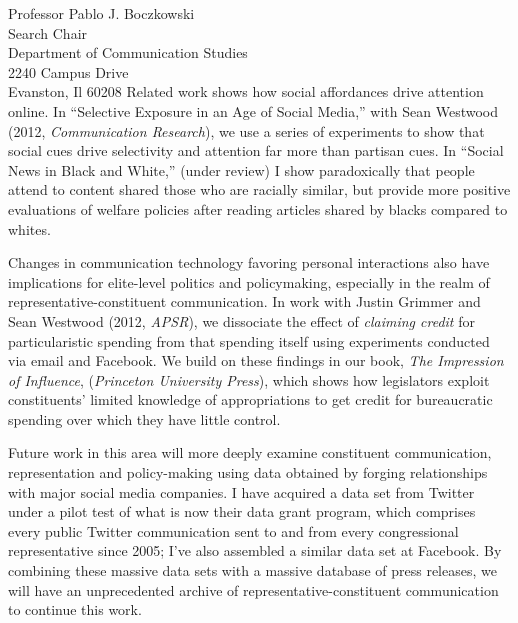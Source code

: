 \documentclass[fontsize=12pt, paper=a4]{scrlttr2}
\begin{document}
\begin{letter}{Professor Pablo J. Boczkowski\\
Search Chair\\
Department of Communication Studies\\
2240 Campus Drive\\
Evanston, Il 60208}
Related work shows how social affordances drive attention online. In ``Selective Exposure in an Age of Social Media,'' with Sean Westwood (2012, \emph{Communication Research}), we use a series of experiments to show that social cues drive selectivity and attention far more than partisan cues.  %
In ``Social News in Black and White,'' (under review) I show paradoxically that people attend to content shared those who are racially similar, but provide more positive evaluations of welfare policies after reading articles shared by blacks compared to whites.  

Changes in communication technology favoring personal interactions also have implications for elite-level politics and policymaking, especially in the realm of representative-constituent communication.  In work with Justin Grimmer and Sean Westwood (2012, \emph{APSR}), we dissociate the effect of \emph{claiming credit} for particularistic spending from that spending itself using  experiments conducted via email and Facebook.  %
We build on these findings in our book, \emph{The Impression of Influence}, (\emph{Princeton University Press}), which shows how legislators exploit constituents' limited knowledge of appropriations to get credit for bureaucratic spending over which they have little control.  

Future work in this area will more deeply examine constituent communication, representation and policy-making using data obtained by forging relationships with major social media companies.  I have acquired a data set from Twitter under a pilot test of what is now their data grant program, which comprises every public Twitter communication sent to and from every congressional representative since 2005; I've also assembled a similar data set at Facebook.  By combining these massive data sets with a massive database of press releases, we will have an unprecedented archive of representative-constituent communication to continue this work.


\end{letter}
\end{document}
